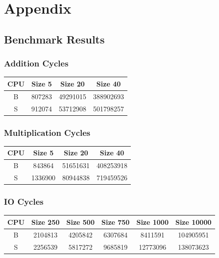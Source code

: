 \chapter{Appendix}
\label{ch:appendix}
\section{Benchmark Results}
\subsection{Addition Cycles}
\begin{center}
        \begin{tabular}{c c c c}
            \hline
            CPU & Size 5 & Size 20 & Size 40 \\
            \hline
            B & 807283 & 49291015 & 388902693 \\
            \hline
            S & 912074 & 53712908 & 501798257 \\
            \hline
        \end{tabular}
\end{center}
\subsection{Multiplication Cycles}
\begin{center}
    \begin{tabular}{c c c c}
        \hline
        CPU & Size 5 & Size 20 & Size 40 \\
        \hline
        B & 843864 & 51651631 & 408253918 \\
        \hline
        S & 1336900 & 80944838 & 719459526 \\
        \hline
    \end{tabular}
\end{center}
\subsection{IO Cycles}
\begin{center}
    \begin{tabular}{c c c c c c}
        \hline
        CPU & Size 250 & Size 500 & Size 750 & Size 1000 & Size 10000 \\
        \hline
        B & 2104813 & 4205842 & 6307684 & 8411591 & 104905951 \\
        \hline
        S & 2256539 & 5817272 & 9685819 & 12773096 & 138073623 \\
        \hline
    \end{tabular}
\end{center}
